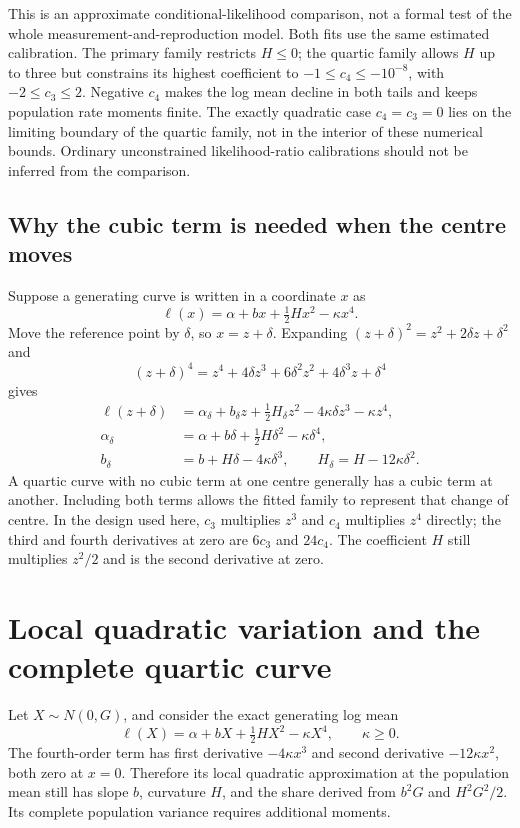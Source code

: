 This is an approximate conditional-likelihood comparison, not a formal test of
the whole measurement-and-reproduction model. Both fits use the same
estimated calibration. The primary family restricts \(H\leq0\); the quartic
family allows \(H\) up to three but constrains its highest coefficient to
\(-1\leq c_4\leq-10^{-8}\), with \(-2\leq c_3\leq2\).
Negative \(c_4\) makes the log mean decline in both tails and keeps
population rate moments finite. The exactly quadratic case \(c_4=c_3=0\)
lies on the limiting boundary of the quartic family, not in the interior of
these numerical bounds. Ordinary unconstrained likelihood-ratio
calibrations should not be inferred from the comparison.

\subsection{Why the cubic term is needed when the centre moves}
\label{estimation:quartic_centring}

Suppose a generating curve is written in a coordinate \(x\) as
\[
 \ell(x)=\alpha+bx+\tfrac12Hx^2-\kappa x^4.
\]
Move the reference point by \(\delta\), so \(x=z+\delta\). Expanding
\((z+\delta)^2=z^2+2\delta z+\delta^2\) and
\[
 (z+\delta)^4=z^4+4\delta z^3+6\delta^2z^2+4\delta^3z+\delta^4
\]
gives
\begin{align}
 \ell(z+\delta)
 &=\alpha_\delta+b_\delta z+\tfrac12H_\delta z^2
       -4\kappa\delta z^3-\kappa z^4,\nonumber\\
 \alpha_\delta&=\alpha+b\delta+\tfrac12H\delta^2-\kappa\delta^4,\nonumber\\
 b_\delta&=b+H\delta-4\kappa\delta^3,\qquad
 H_\delta=H-12\kappa\delta^2.
 \label{estimation:quartic_shift}
\end{align}
A quartic curve with no cubic term at one centre generally has a cubic term
at another. Including both terms allows the fitted family to represent that
change of centre. In the design used here, \(c_3\) multiplies \(z^3\) and
\(c_4\) multiplies \(z^4\) directly; the third and fourth derivatives at zero
are \(6c_3\) and \(24c_4\). The coefficient \(H\) still multiplies \(z^2/2\)
and is the second derivative at zero.

\section{Local quadratic variation and the complete quartic curve}
\label{estimation:quartic}

Let \(X\sim N(0,G)\), and consider the exact generating log mean
\begin{equation}
 \ell(X)=\alpha+bX+\tfrac12HX^2-\kappa X^4,
 \qquad \kappa\geq0.
 \label{estimation:quartic_truth}
\end{equation}
The fourth-order term has first derivative \(-4\kappa x^3\) and second
derivative \(-12\kappa x^2\), both zero at \(x=0\). Therefore its local
quadratic approximation at the population mean still has slope \(b\),
curvature \(H\), and the share derived from \(b^2G\) and \(H^2G^2/2\).
Its complete population variance requires additional moments.

